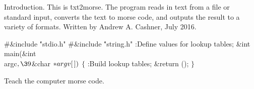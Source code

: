 

Introduction.
This is \.{txt2morse}.
The program reads in text from a file or standard input, converts the text to
morse code, and outputs the result to a variety of formats.
Written by Andrew A. Cashner, July 2016.

\Y\B\8\#\&{include} \.{"stdio.h"}\6
\8\#\&{include} \.{"string.h"}\6
:Define values for lookup tables\X;\7
\&{int} \\{main}(\&{int} \\{argc}${},\39{}$\&{char} ${}{*}\\{argv}[\,]){}$\1\1%
\2\2\6
${}\{{}$\1\6
:Build lookup tables\X;\6
\&{return} ();\6
\4${}\}{}$\2\par
\fi

Teach the computer morse code.

